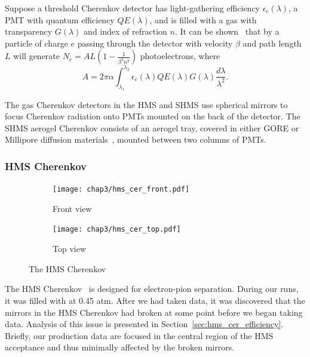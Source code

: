 Suppose a threshold Cherenkov detector has
light-gathering efficiency $\epsilon_c(\lambda)$,
a PMT with quantum efficiency $QE(\lambda)$,
and is filled with a gas with transparency $G(\lambda)$
and index of refraction $n$.
It can be shown~\cite{NGC_Design_Report} that by a particle of charge $e$ passing through the detector
with velocity $\beta$ and path length $L$ will generate
$N_e =AL\left(1-\frac{1}{\beta^2n^2}\right)$ photoelectrons, where
\begin{equation}
A = 2 \pi \alpha \int_{\lambda_1}^{\lambda_2} \epsilon_c(\lambda)QE(\lambda)G(\lambda)\frac{d\lambda}{\lambda^2}.
\end{equation}

The gas Cherenkov detectors in the HMS and SHMS use spherical mirrors to focus
Cherenkov radiation onto PMTs mounted on the back of the detector. The SHMS
aerogel Cherenkov consists of an aerogel tray, covered in either GORE or
Millipore diffusion materials~\cite{Horn_2017}, mounted between two columns
of PMTs.

\subsubsection{HMS Cherenkov}

\begin{figure}[ht]
    \centering
    \begin{subfigure}[b]{0.4\textwidth}
        \centering
        \texttt{[image: chap3/hms\_cer\_front.pdf]}
        \caption{Front view}
        \label{fig:hms_cer_front}
    \end{subfigure}
    \hfill
    \begin{subfigure}[b]{0.4\textwidth}
        \centering
        \texttt{[image: chap3/hms\_cer\_top.pdf]}
        \caption{Top view}
        \label{fig:hms_cer_top}
    \end{subfigure}
    \caption{The HMS Cherenkov}
    \label{fig:hms_cherenkov}
\end{figure}

The HMS Cherenkov~\cite{Cothran_1995} is designed for electron-pion separation.
During our runs, it was filled with  at 0.45 atm.
After we had taken data, it was discovered that the mirrors in the HMS
Cherenkov had broken at some point before we began taking data.
Analysis of this issue is presented in Section~\ref{sec:hms_cer_efficiency}.
Briefly, our production data are focused in the central region of the
HMS acceptance and thus minimally affected by the broken mirrors.

